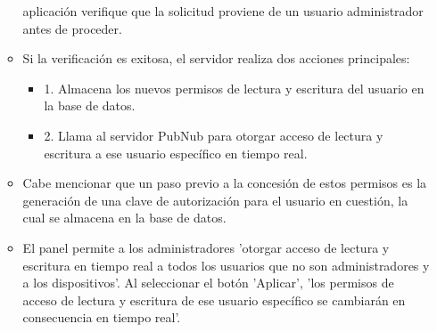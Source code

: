 \documentclass{report}
\begin{document}
\begin{itemize}
\begin{itemize}
        aplicación verifique que la solicitud proviene de un usuario administrador antes de proceder.
        \item Si la verificación es exitosa, el servidor realiza dos acciones principales:
        \begin{itemize}
            \item 1. Almacena los nuevos permisos de lectura y escritura del usuario en la base de datos.
            \item 2. Llama al servidor PubNub para otorgar acceso de lectura y escritura a ese usuario específico en tiempo real.
        \end{itemize}
        \item Cabe mencionar que un paso previo a la concesión de estos permisos es la generación de una clave de autorización para el usuario 
        en cuestión, la cual se almacena en la base de datos.
        \item El panel permite a los administradores 'otorgar acceso de lectura y escritura en tiempo real a todos los usuarios que no son 
        administradores y a los dispositivos'. Al seleccionar el botón 'Aplicar', 'los permisos de acceso de lectura y escritura de ese 
        usuario específico se cambiarán en consecuencia en tiempo real'.
    \end{itemize}
\end{itemize}
\end{document}

